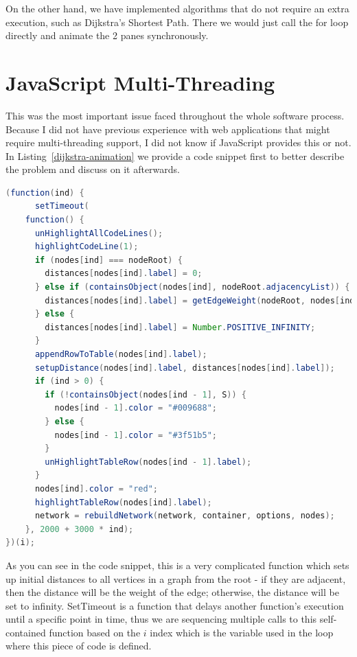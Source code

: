 \documentclass{l4proj}
\begin{document}
On the other hand, we have implemented algorithms that do not require an extra execution, such as Dijkstra's
Shortest Path. There we would just call the for loop directly and animate the 2 panes synchronously.

\section{JavaScript Multi-Threading}

This was the most important issue faced throughout the whole software process. Because I did not have previous
experience with web applications that might require multi-threading support, I did not know if JavaScript provides this
or not. In Listing~\ref{dijkstra-animation} we provide a code snippet first to better describe the problem and discuss
on it afterwards.

\begin{lstlisting}[language={Java}, label={dijkstra-animation},caption={Animation function used in Dijkstra's SP
algorithm.}]
(function(ind) {
      setTimeout(
	function() {
	  unHighlightAllCodeLines();
	  highlightCodeLine(1);
	  if (nodes[ind] === nodeRoot) {
	    distances[nodes[ind].label] = 0;
	  } else if (containsObject(nodes[ind], nodeRoot.adjacencyList)) {
	    distances[nodes[ind].label] = getEdgeWeight(nodeRoot, nodes[ind]);
	  } else {
	    distances[nodes[ind].label] = Number.POSITIVE_INFINITY;
	  }
	  appendRowToTable(nodes[ind].label);
	  setupDistance(nodes[ind].label, distances[nodes[ind].label]);
	  if (ind > 0) {
	    if (!containsObject(nodes[ind - 1], S)) {
	      nodes[ind - 1].color = "#009688";
	    } else {
	      nodes[ind - 1].color = "#3f51b5";
	    }
	    unHighlightTableRow(nodes[ind - 1].label);
	  }
	  nodes[ind].color = "red";
	  highlightTableRow(nodes[ind].label);
	  network = rebuildNetwork(network, container, options, nodes);
	}, 2000 + 3000 * ind);
})(i);
\end{lstlisting}

As you can see in the code snippet, this is a very complicated function which sets up initial distances to all vertices in a graph from
the root - if they are adjacent, then the distance will be the weight of the edge; otherwise, the distance will be set
to infinity. SetTimeout is a function that delays another function's execution until a specific point in time, thus we are sequencing
multiple calls to this self-contained function based on the $i$ index which is the variable used in the loop where
this piece of code is defined. 
\end{document}
